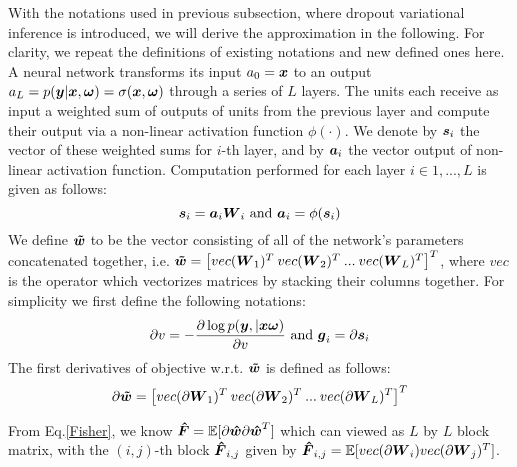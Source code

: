With the notations used in previous subsection, where dropout variational inference is introduced, we will derive the approximation in the following. For clarity, we repeat the definitions of existing notations and new defined ones here. A neural network transforms its input $a_0 = \boldsymbol x$ to an output $a_L=p(\boldsymbol y| \boldsymbol x, \boldsymbol \omega)=\sigma(\boldsymbol x, \boldsymbol \omega)$ through a series of $L$ layers. The units each receive as input a weighted sum of outputs of units from the previous layer and compute their output via a non-linear activation function $\phi(\cdot)$. We denote by $\boldsymbol s_i$ the vector of these weighted sums for $i$-th layer, and by $\boldsymbol a_i$ the vector output of non-linear activation function. Computation performed for each layer $i\in{1,...,L}$ is given as follows:
\begin{equation}
\boldsymbol s_i = \boldsymbol a_i\boldsymbol W_i \text{ and } \boldsymbol a_i = \phi(\boldsymbol s_i)
\end{equation}
We define $\boldsymbol{\tilde{w}}$ to be the vector consisting of all of the network's parameters concatenated together, i.e. $\boldsymbol{\tilde{w}}= \big[vec(\boldsymbol W_1)^T \: vec(\boldsymbol W_2)^T \: ...\:vec(\boldsymbol W_L)^T\big]^T$, where $vec$ is the operator which vectorizes matrices by stacking their columns together. 
For simplicity we first define the following notations:
\[
\partial v = -\frac{\partial \log{p(\boldsymbol y, | \boldsymbol x \boldsymbol\omega)}}{\partial v} \text{ and } \boldsymbol g_i = \partial \boldsymbol s_i
\]
The first derivatives of objective w.r.t. $\boldsymbol{\tilde{w}}$ is defined as follows:
\begin{equation}
\begin{aligned}
\partial \boldsymbol{\tilde{w}} = \big[vec(\partial \boldsymbol W_1)^T\: vec(\partial \boldsymbol W_2)^T\: ...\:vec(\partial \boldsymbol W_L)^T\big]^T
\end{aligned}
\end{equation}

From Eq.\ref{Fisher}, we know $\boldsymbol{\hat F} = \mathbb E[\partial \boldsymbol{\hat w}\partial \boldsymbol{\hat w}^T]$ which can viewed as $L$ by $L$ block matrix, with the $(i,j)$-th block $\boldsymbol{\hat F}_{i,j}$ given by $\boldsymbol{\hat F}_{i,j} = \mathbb E[vec(\partial\boldsymbol W_i)vec(\partial\boldsymbol W_j)^T]$.

